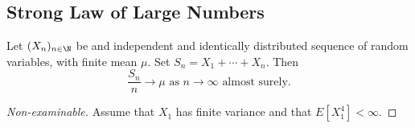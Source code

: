 \documentclass[../Main.tex]{subfiles}
\begin{document}
\subsection{Strong Law of Large Numbers}
\begin{theorem}
    Let $(X_n)_{n \in \N}$ be and independent and identically distributed sequence of random variables, with finite mean $\mu$. Set $S_n = X_1 + \cdots + X_n$. Then
    \begin{equation*}
        \frac{S_n}{n} \to \mu \text{ as } n \to \infty \text{ almost surely.}
    \end{equation*}
    \label{thmStrongLawLargeNums}
\end{theorem}
\begin{proof}[Non-examinable]
    Assume that $X_1$ has finite variance and that $E[X_1^4] < \infty$.


\end{proof}
\end{document}
